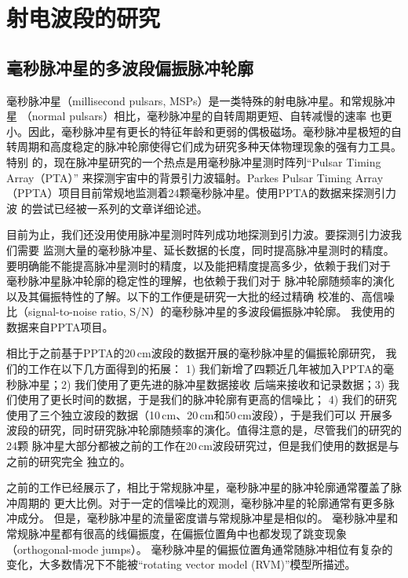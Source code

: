 
\chapter{射电波段的研究}

\section{毫秒脉冲星的多波段偏振脉冲轮廓}

毫秒脉冲星（millisecond pulsars, MSPs）是一类特殊的射电脉冲星。和常规脉冲星
（normal pulsars）相比，毫秒脉冲星的自转周期更短、自转减慢的速率
也更小。因此，毫秒脉冲星有更长的特征年龄和更弱的偶极磁场。毫秒脉冲星极短的自
转周期和高度稳定的脉冲轮廓使得它们成为研究多种天体物理现象的强有力工具。特别
的，现在脉冲星研究的一个热点是用毫秒脉冲星测时阵列“Pulsar Timing Array（PTA）”
来探测宇宙中的背景引力波辐射\supercite{Foster90}。Parkes Pulsar Timing Array
（PPTA）项目目前常规地监测着24颗毫秒脉冲星。使用PPTA的数据来探测引力波
的尝试已经被一系列的文章详细论述\supercite{Shannon13b,Wang15,Zhu14}。

目前为止，我们还没用使用脉冲星测时阵列成功地探测到引力波。要探测引力波我们需要
监测大量的毫秒脉冲星、延长数据的长度，同时提高脉冲星测时的精度\supercite{Cordes12}。
要明确能不能提高脉冲星测时的精度，以及能把精度提高多少，依赖于我们对于
毫秒脉冲星脉冲轮廓的稳定性的理解\supercite{Shannon14}，也依赖于我们对于
脉冲轮廓随频率的演化以及其偏振特性的了解。以下的工作便是研究一大批的经过精确
校准的、高信噪比（signal-to-noise ratio, S/N）的毫秒脉冲星的多波段偏振脉冲轮廓。
我使用的数据来自PPTA项目。

相比于之前基于PPTA的20\,cm波段的数据开展的毫秒脉冲星的偏振轮廓研究\supercite{Yan11a}，
我们的工作在以下几方面得到的拓展：
1) 我们新增了四颗近几年被加入PPTA的毫秒脉冲星；2) 我们使用了更先进的脉冲星数据接收
后端来接收和记录数据；3) 我们使用了更长时间的数据，于是我们的脉冲轮廓有更高的信噪比；
4) 我们的研究使用了三个独立波段的数据（10\,cm、20\,cm和50\,cm波段），于是我们可以
开展多波段的研究，同时研究脉冲轮廓随频率的演化。值得注意的是，尽管我们的研究的24颗
脉冲星大部分都被之前的工作在20\,cm波段研究过，但是我们使用的数据是与之前的研究完全
独立的。

之前的工作已经展示了，相比于常规脉冲星，毫秒脉冲星的脉冲轮廓通常覆盖了脉冲周期的
更大比例。对于一定的信噪比的观测，毫秒脉冲星的轮廓通常有更多脉冲成分\supercite{Yan11a}。
但是，毫秒脉冲星的流量密度谱与常规脉冲星是相似的\supercite{Toscano98,Kramer98,Kramer99}。
毫秒脉冲星和常规脉冲星都有很高的线偏振度，在偏振位置角中也都发现了跳变现象
（orthogonal-mode jumps）\supercite{Thorsett90,Navarro97,Stairs99,Manchester04,Ord04}。
毫秒脉冲星的偏振位置角通常随脉冲相位有复杂的变化，大多数情况下不能被“rotating vector model (RVM)”模型所描述\supercite{Radhakrishnan69}。

